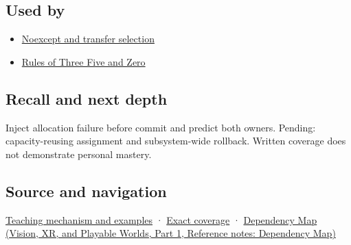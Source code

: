 \subsection{Used by}\label{appendix-bea6beb5350f-used-by}

\hypertarget{appendix-bea6beb5350f-used-by}{}

\begin{itemize}
\tightlist
\item
  \hyperref[appendix-c746afaa47d1]{Noexcept and transfer selection}
\item
  \hyperref[appendix-7679107d057e]{Rules of Three Five and Zero}
\end{itemize}

\subsection{Recall and next depth}\label{appendix-bea6beb5350f-recall-and-next-depth}

\hypertarget{appendix-bea6beb5350f-recall-and-next-depth}{}

Inject allocation failure before commit and predict both owners. Pending: capacity-reusing assignment and subsystem-wide rollback. Written coverage does not demonstrate personal mastery.

\subsection{Source and navigation}\label{appendix-bea6beb5350f-source-and-navigation}

\hypertarget{appendix-bea6beb5350f-source-and-navigation}{}

\hyperref[01-foundations-i-ch003-replacing-a-value-is-not-creating-an-object]{Teaching mechanism and examples} · \hyperref[appendix-fd090d982a15-m009---parts-127-147]{Exact coverage} · \href{../07-Vision-XR-and-Playable-Worlds-P01/main.pdf\#appendix-4ad47bdd269a}{Dependency Map (Vision, XR, and Playable Worlds, Part 1, Reference notes: Dependency Map)}
